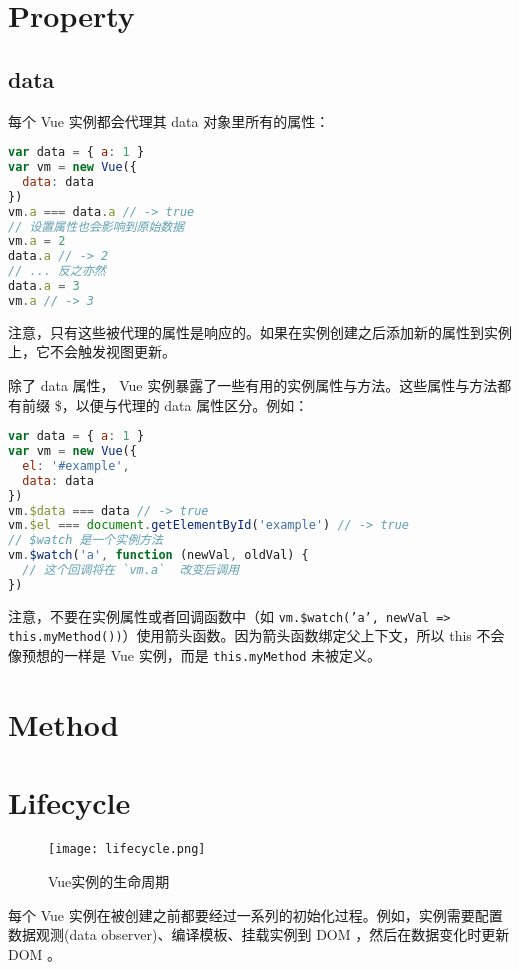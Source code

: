 \section{Property}

\subsection{data}

每个 Vue 实例都会代理其 data 对象里所有的属性：

\begin{lstlisting}[language=JavaScript]
var data = { a: 1 }
var vm = new Vue({
  data: data
})
vm.a === data.a // -> true
// 设置属性也会影响到原始数据
vm.a = 2
data.a // -> 2
// ... 反之亦然
data.a = 3
vm.a // -> 3
\end{lstlisting}

注意，只有这些被代理的属性是响应的。如果在实例创建之后添加新的属性到实例上，它不会触发视图更新。

除了 data 属性， Vue 实例暴露了一些有用的实例属性与方法。这些属性与方法都有前缀 \$，以便与代理的 data 属性区分。例如：

\begin{lstlisting}[language=JavaScript]
var data = { a: 1 }
var vm = new Vue({
  el: '#example',
  data: data
})
vm.$data === data // -> true
vm.$el === document.getElementById('example') // -> true
// $watch 是一个实例方法
vm.$watch('a', function (newVal, oldVal) {
  // 这个回调将在 `vm.a`  改变后调用
})
\end{lstlisting}

注意，不要在实例属性或者回调函数中（如 \texttt{vm.\$watch('a', newVal => this.myMethod())}）使用箭头函数。因为箭头函数绑定父上下文，所以 this 不会像预想的一样是 Vue 实例，而是 \texttt{this.myMethod} 未被定义。

\section{Method}


\section{Lifecycle}

\begin{figure}[htbp]
\centering
\texttt{[image: lifecycle.png]}
\caption{Vue实例的生命周期}
\end{figure}

每个 Vue 实例在被创建之前都要经过一系列的初始化过程。例如，实例需要配置数据观测(data observer)、编译模板、挂载实例到 DOM ，然后在数据变化时更新 DOM 。


